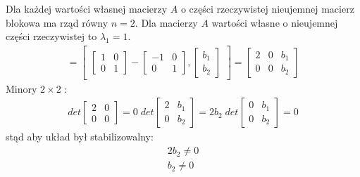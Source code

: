 \documentclass[a4paper,11pt]{article}
\begin{document}
Dla każdej wartości własnej macierzy \( A \) o części rzeczywistej nieujemnej macierz blokowa ma rząd równy \( n =2 \). Dla macierzy \( A \) wartości własne o nieujemnej części rzeczywistej to \( \lambda_{1} = 1 \). 
\begin{align*}
[ \lambda _{1}I-A,B]=
\begin{bmatrix}
\begin{bmatrix}
1 & 0 \\
0 & 1 
\end{bmatrix}
-
\begin{bmatrix}
-1 & 0 \\
0  & 1
\end{bmatrix}
,
\begin{bmatrix}
b_{1} \\
b_{2}
\end{bmatrix}
\end{bmatrix}=
\begin{bmatrix}
2 & 0 & b_{1} \\
0 & 0 & b_{2}
\end{bmatrix}
\end{align*} 
Minory \( 2\times 2\) :
\begin{align*}
det\begin{bmatrix}
2 & 0 \\
0 & 0
\end{bmatrix} = 0
\;
det\begin{bmatrix}
2 & b_{1} \\
0 & b_{2}
\end{bmatrix}
= 2b_{2}
\;
det \begin{bmatrix}
0 & b_{1} \\
0 & b_{2}
\end{bmatrix}
= 0
\end{align*}
stąd aby układ był stabilizowalny:
\begin{align*}
2b_{2} \neq 0 \\
b_{2} \neq 0
\end{align*}
\end{document}
